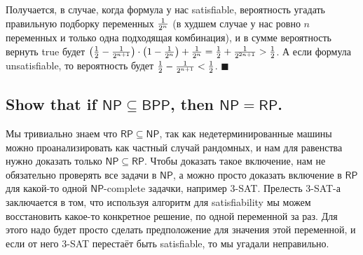 \documentclass{article}
\newcommand{\RP}{\ensuremath{\mathsf{RP}}}
\newcommand{\BPP}{\ensuremath{\mathsf{BPP}}}
\newcommand{\NP}{\ensuremath{\mathsf{NP}}}
\begin{document}
  Получается, в случае, когда формула у нас satisfiable, вероятность угадать правильную подборку переменных $\frac{1}{2^n}$ (в худшем случае у нас ровно $n$ переменных и только одна подходящая комбинация), и в сумме вероятность вернуть true будет $\left(\frac{1}{2} - \frac{1}{2^{n+1}}\right) \cdot \left(1-\frac{1}{2^n}\right) + \frac{1}{2^n} = \frac{1}{2} + \frac{1}{2^{2n+1}} > \frac{1}{2}$.
  А если формула unsatisfiable, то вероятность будет $\frac{1}{2} - \frac{1}{2^{n+1}} < \frac{1}{2}$.
  $\blacksquare$

  \subsection{Show that if $\NP \subseteq \BPP$, then $\NP = \RP$.}



  Мы тривиально знаем что $\RP \subseteq \NP$, так как недетерминированные машины можно проанализировать как частный случай рандомных, и нам для равенства нужно доказать только $\NP \subseteq \RP$.
  Чтобы доказать такое включение, нам не обязательно проверять все задачи в \NP, а можно просто доказать включение в \RP{} для какой-то одной \NP-complete задачки, например 3-SAT.
  Прелесть 3-SAT-а заключается в том, что используя алгоритм для satisfiability мы можем восстановить какое-то конкретное решение, по одной переменной за раз.
  Для этого надо будет просто сделать предположение для значения этой переменной, и если от него 3-SAT перестаёт быть satisfiable, то мы угадали неправильно.
\end{document}

